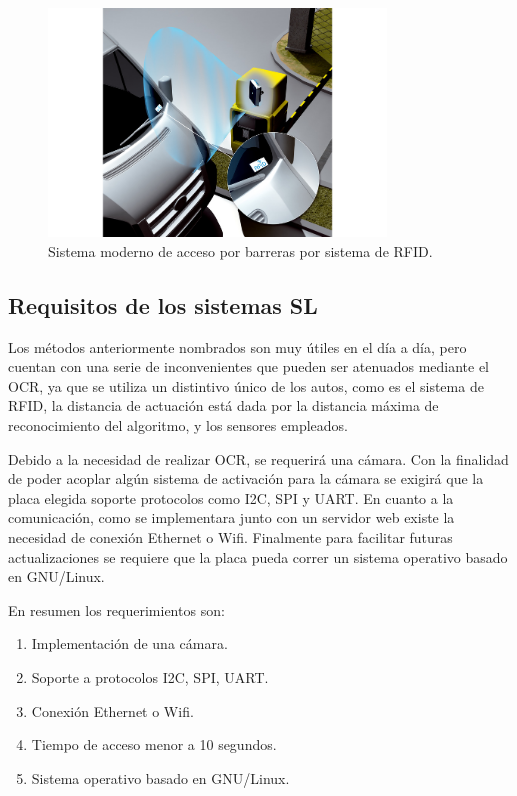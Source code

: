\begin{figure}
    \centering
    \includegraphics[width=0.8\textwidth]{imgs/sistema-control-acceso-barreras-rfid.jpg}
    \caption{Sistema moderno de acceso por barreras por sistema de RFID.}
    \label{fig:sistema-moderno}
\end{figure}

\subsection{Requisitos de los sistemas SL}

Los métodos anteriormente nombrados son muy útiles en el día a día, pero cuentan con una serie de inconvenientes que pueden ser atenuados mediante el OCR, ya que se utiliza un distintivo único de los autos, como es el sistema de RFID, la distancia de actuación está dada por la distancia máxima de reconocimiento del algoritmo, y los sensores empleados.

Debido a la necesidad de realizar OCR, se requerirá una cámara. Con la finalidad de poder acoplar algún sistema de activación para la cámara se exigirá que la placa elegida soporte protocolos como I2C, SPI y UART. En cuanto a la comunicación, como se implementara junto con un servidor web existe la necesidad de conexión Ethernet o Wifi. Finalmente para facilitar futuras actualizaciones se requiere que la placa pueda correr un sistema operativo basado en GNU/Linux.

En resumen los requerimientos son:

\begin{enumerate}
    \item Implementación de una cámara.
    \item Soporte a protocolos I2C, SPI, UART.
    \item Conexión Ethernet o Wifi.
    \item Tiempo de acceso menor a 10 segundos.
    \item Sistema operativo basado en GNU/Linux.
\end{enumerate}


